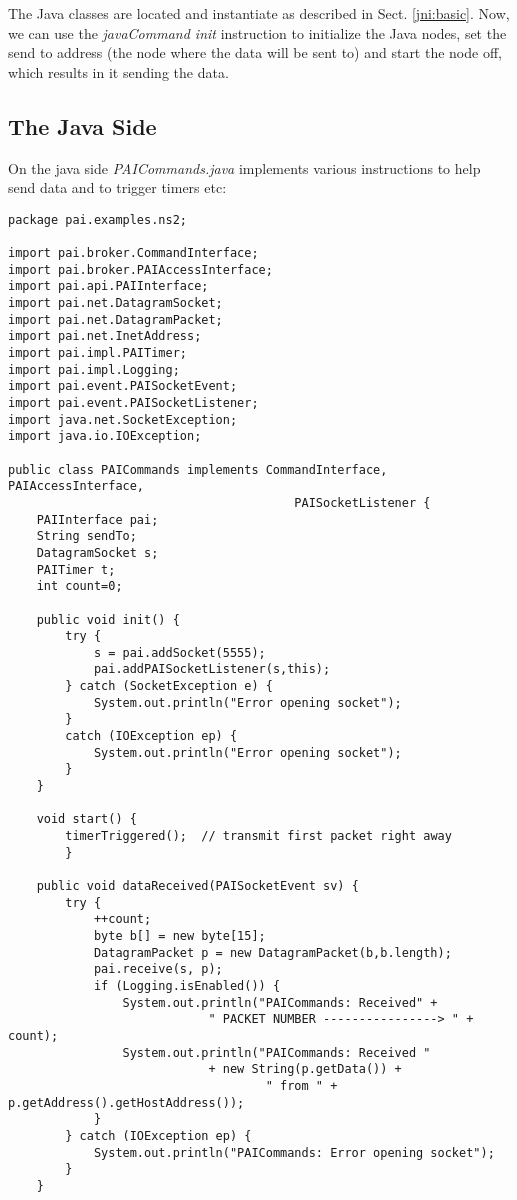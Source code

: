 The Java classes are located and instantiate as described in Sect.
\ref{jni:basic}. Now, we can use the \emph{javaCommand init} instruction 
to initialize the Java  nodes, set the send to address (the node 
where the data will be sent to) and start the node off, which 
results in it sending the data.

\subsection{The Java Side}
\label{jni:javaside}

On the java side \emph{PAICommands.java} implements various
instructions to help send data and to trigger timers etc:

\footnotesize
\begin{verbatim}
package pai.examples.ns2;

import pai.broker.CommandInterface;
import pai.broker.PAIAccessInterface;
import pai.api.PAIInterface;
import pai.net.DatagramSocket;
import pai.net.DatagramPacket;
import pai.net.InetAddress;
import pai.impl.PAITimer;
import pai.impl.Logging;
import pai.event.PAISocketEvent;
import pai.event.PAISocketListener;
import java.net.SocketException;
import java.io.IOException;

public class PAICommands implements CommandInterface, PAIAccessInterface,
                                        PAISocketListener {
    PAIInterface pai;
    String sendTo;
    DatagramSocket s;
    PAITimer t;
    int count=0;

    public void init() {
        try {
            s = pai.addSocket(5555);
            pai.addPAISocketListener(s,this);
        } catch (SocketException e) {
            System.out.println("Error opening socket");
        }
        catch (IOException ep) {
            System.out.println("Error opening socket");
        }
    }

    void start() {
	    timerTriggered();  // transmit first packet right away
        }

    public void dataReceived(PAISocketEvent sv) {
        try {
            ++count;
            byte b[] = new byte[15];
            DatagramPacket p = new DatagramPacket(b,b.length);
            pai.receive(s, p);
            if (Logging.isEnabled()) {
                System.out.println("PAICommands: Received" + 
                			" PACKET NUMBER ----------------> " + count);
                System.out.println("PAICommands: Received " 
                			+ new String(p.getData()) +
                        			" from " + p.getAddress().getHostAddress());
            }
        } catch (IOException ep) {
            System.out.println("PAICommands: Error opening socket");
        }
    }


\end{verbatim}
